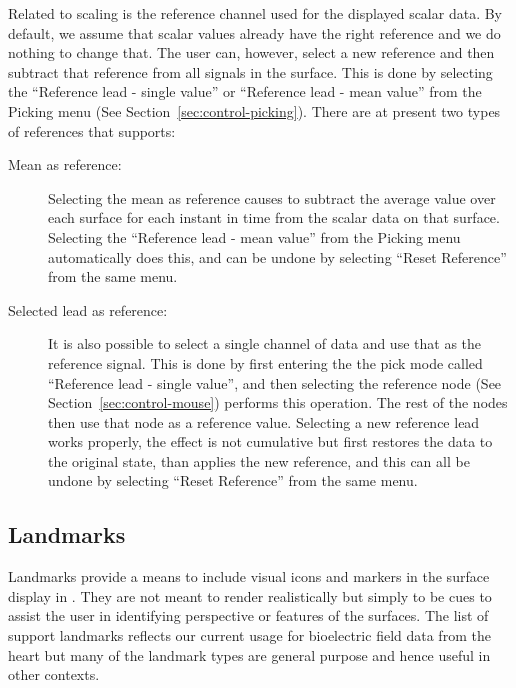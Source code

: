 Related to scaling is the reference channel used for the displayed scalar
data.  By default, we assume that scalar values already have the right
reference and we do nothing to change that.  The user can, however, select
a new reference and then subtract that reference from all signals in the
surface.  This is done by selecting the ``Reference lead - single value''
or ``Reference lead - mean value'' from the Picking menu (See
Section~\ref{sec:control-picking}).  There are at present two types of
references that \map{} supports:
\begin{description}
  \item[Mean as reference: ] Selecting the mean as reference causes \map{}
    to subtract the average value over each surface for each instant in
    time from the scalar data on that surface.  Selecting the ``Reference
    lead - mean value'' from the Picking menu automatically does this, and
    can be undone by selecting ``Reset Reference'' from the same menu.
    
  \item[Selected lead as reference: ] It is also possible to select a
    single channel of data and use that as the reference signal.  This is
    done by first entering the the pick mode called ``Reference lead -
    single value'', and then selecting the reference node (See
    Section~\ref{sec:control-mouse}) performs this operation.  The rest of
    the nodes then use that node as a reference value.  Selecting a new
    reference lead works properly, \ie{} the effect is not cumulative but
    first restores the data to the original state, than applies the new
    reference, and this can all be undone by selecting ``Reset Reference''
    from the same menu.
\end{description}



\subsection{Landmarks}
\label{sec:landmarks}

Landmarks provide a means to include visual icons and markers in the
surface display in \map{}.  They are not meant to render realistically but
simply to be cues to assist the user in identifying perspective or features
of the surfaces.  The list of support landmarks reflects our current usage
for bioelectric field data from the heart but many of the landmark types
are general purpose and hence useful in other contexts.  

